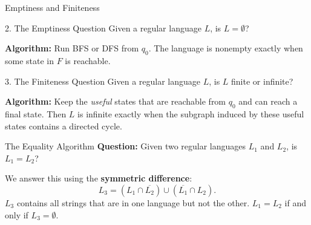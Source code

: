 \documentclass[10pt]{beamer}
\begin{document}
\begin{frame}{Emptiness and Finiteness}
  \small
  \begin{block}{2. The Emptiness Question}
    Given a regular language $L$, is $L = \emptyset$?
    \par\smallskip
    \textbf{Algorithm:} Run BFS or DFS from $q_0$. The language is nonempty
    exactly when some state in $F$ is reachable.
  \end{block}
  \pause
  
  \begin{block}{3. The Finiteness Question}
    Given a regular language $L$, is $L$ finite or infinite?
    \par\smallskip
    \textbf{Algorithm:} Keep the \emph{useful} states that are reachable from
    $q_0$ and can reach a final state. Then $L$ is infinite exactly when the
    subgraph induced by these useful states contains a directed cycle.
  \end{block}
\end{frame}

\begin{frame}{The Equality Algorithm}
  \textbf{Question:} Given two regular languages $L_1$ and $L_2$, is $L_1 = L_2$?
  \pause
  
  We answer this using the \textbf{symmetric difference}:
  \[
    L_3=(L_1\cap\overline{L_2})\cup(\overline{L_1}\cap L_2).
  \]
  $L_3$ contains all strings that are in one language but not the other. $L_1 = L_2$ if and only if $L_3 = \emptyset$.
  \pause
  
  \begin{center}
  \end{center}
\end{frame}
\end{document}
